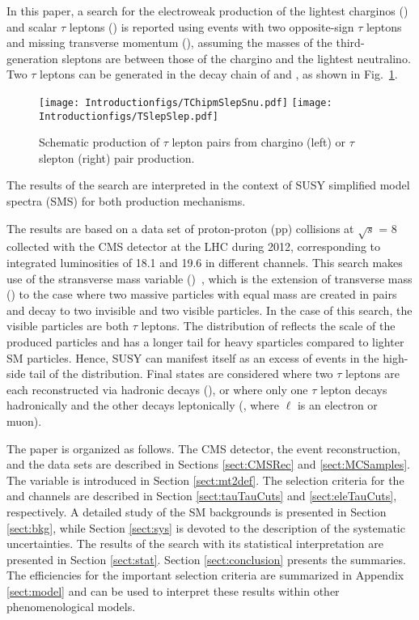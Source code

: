In this paper, a search for the electroweak production of the lightest charginos (\chione) and scalar $\tau$  leptons (\stau) is reported using events 
with two opposite-sign $\tau$ leptons and 
missing transverse momentum (\MPT), assuming the masses of the third-generation sleptons are between those of the 
chargino and the lightest neutralino. 
Two $\tau$ leptons can be generated in the decay chain of \chione and \sTau, as shown in Fig.~\ref{fig:Productions}. 
\begin{figure}[!htb]
\centering
\texttt{[image: Introductionfigs/TChipmSlepSnu.pdf]}
\texttt{[image: Introductionfigs/TSlepSlep.pdf]}

\caption{Schematic production of $\tau$ lepton pairs from chargino (left) or $\tau$ slepton (right) pair production.}
\label{fig:Productions}
\end{figure}
The results of the search are interpreted in the context of SUSY simplified model spectra (SMS) \cite{Alwall:2008ag,alves:sms} for both
production mechanisms.


The results are based on a data set of proton-proton (pp)
collisions at $\sqrt{s}$ = 8\TeV
collected with the CMS detector at the LHC during 2012, corresponding to integrated
luminosities of 18.1 and 19.6 \invfb in different channels. 
This search makes use of the stransverse mass variable (\mttwo)~\cite{Lester:1999tx,Barr:2003rg},
which is the extension of transverse mass (\mt) to the case 
where two massive particles with equal mass are created in pairs  
and decay to two invisible and two visible particles. 
In the case of this search, the visible particles are both $\tau$ leptons.
The distribution of \mttwo reflects the scale of the produced particles and has a longer tail for heavy sparticles
compared to lighter SM particles. Hence, SUSY 
can manifest itself
as an excess of events in the high-side tail of the \mttwo distribution. 
Final states are considered where
two $\tau$ leptons are each reconstructed via hadronic decays (\tauTau), 
or where only one $\tau$ lepton  decays hadronically and 
the other decays leptonically (\leptonTau, where $\ell$ is an electron or muon). 

The paper is organized as follows.  The CMS detector, the event reconstruction, and the data sets are described
in Sections \ref{sect:CMSRec} and \ref{sect:MCSamples}. The \mttwo variable is introduced in Section \ref{sect:mt2def}. 
The selection criteria for the \tauTau and \leptonTau channels are described in Section \ref{sect:tauTauCuts} and \ref{sect:eleTauCuts}, respectively. 
A detailed study of the SM backgrounds is presented in Section \ref{sect:bkg}, while Section \ref{sect:sys} 
is devoted to the description of the systematic uncertainties.  The results of the search with its statistical interpretation are presented in 
Section \ref{sect:stat}. Section \ref{sect:conclusion} presents the summaries. The efficiencies for the important selection criteria are summarized in Appendix \ref{sect:model} and can be used to interpret these results within other phenomenological models. 




